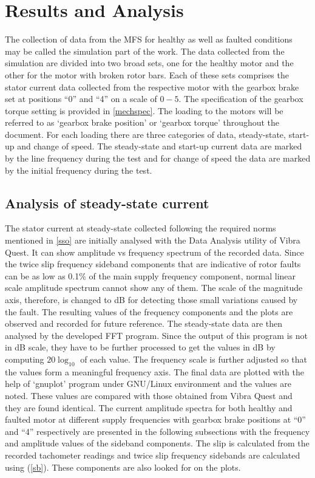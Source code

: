 \documentclass[a4paper,11pt]{report}
\begin{document}
\chapter{Results and Analysis} \label{results}
The collection of data from the MFS for healthy as well as faulted conditions may be called the simulation part of the work. The data collected from the simulation are divided into two broad sets, one for the healthy motor and the other for the motor with broken rotor bars. Each of these sets comprises the stator current data collected from the respective motor with the gearbox brake set at positions ``0'' and ``4'' on a scale of $0-5$. The specification of the gearbox torque setting is provided in \ref{mechspec}. The loading to the motors will be referred to as `gearbox brake position' or `gearbox torque' throughout the document. For each loading there are three categories of data, steady-state, start-up and change of speed. The steady-state and start-up current data are marked by the line frequency during the test and for change of speed the data are marked by the initial frequency during the test.

\section{Analysis of steady-state current}
The stator current at steady-state collected following the required norms mentioned in \ref{sso} are initially analysed with the Data Analysis utility of Vibra Quest. It can show amplitude vs frequency spectrum of the recorded data. Since the twice slip frequency sideband components that are indicative of rotor faults can be as low as 0.1\% of the main supply frequency component, normal linear scale amplitude spectrum cannot show any of them. The scale of the magnitude axis, therefore, is changed to dB for detecting those small variations caused by the fault. The resulting values of the frequency components and the plots are observed and recorded for future reference. The steady-state data are then analysed by the developed FFT program. Since the output of this program is not in dB scale, they have to be further processed to get the values in dB by computing $20\log_{10}$ of each value. The frequency scale is further adjusted so that the values form a meaningful frequency axis. The final data are plotted with the help of `gnuplot' program under GNU/Linux environment and the values are noted. These values are compared with those obtained from Vibra Quest and they are found identical. The current amplitude spectra for both healthy and faulted motor at different supply frequencies with gearbox brake positions at ``0'' and ``4'' respectively are presented in the following subsections with the frequency and amplitude values of the sideband components. The slip is calculated from the recorded tachometer readings and twice slip frequency sidebands are calculated using (\ref{sb}). These components are also looked for on the plots.
\end{document}
